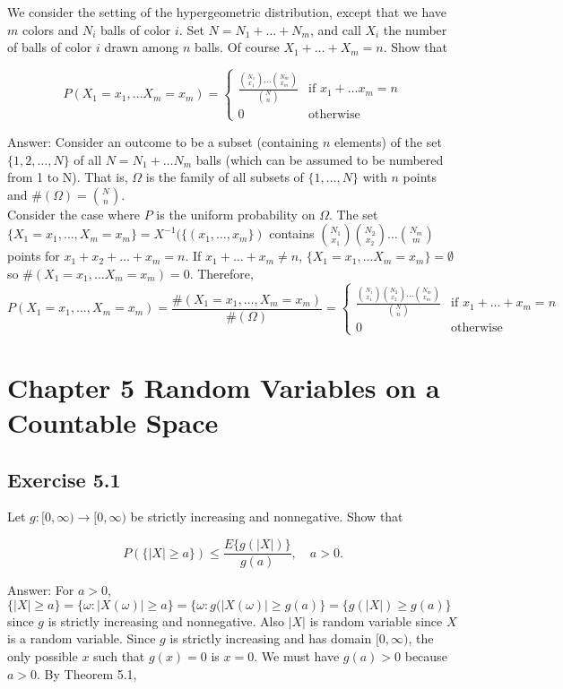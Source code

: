 \documentclass{article}
\begin{document}
We consider the setting of the hypergeometric distribution, except that we have $m$ colors and $N_i$ balls of color $i$. Set $N = N_1+\dots +N_m$, and call $X_i$ the
number of balls of color $i$ drawn among $n$ balls. Of course $X_1 + \dots +X_m = n$.
Show that

$$
P(X_1 = x_1, \dots X_m = x_m) = 
\begin{cases}
\frac{\binom{N_1}{x_1} \dots \binom{N_m}{x_m}}{\binom{N}{n}} & \text{if } x_1 + \dots x_m = n \\
0 & \text{otherwise}
\end{cases}
$$

Answer: Consider an outcome to be a subset (containing $n$ elements) of the set $\{1,2, \dots, N\}$ of all $N = N_1+\dots N_m$ balls (which can be assumed to be numbered from 1 to N). That is, $\Omega$ is the family of all subsets of $\{1,\dots, N\}$ with $n$ points and $\#(\Omega) = \binom{N}{n}$. \\

Consider the case where $P$ is the uniform probability on $\Omega$. The set $\{X_1 = x_1, \dots , X_m = x_m\} = X^{-1}(\{(x_1, \dots , x_m\})$ contains $\binom{N_1}{x_1}\binom{N_2}{x_2} \dots \binom{N_m}{m}$ points for $x_1 + x_2 + \dots + x_m = n$. If $x_1 + \dots + x_m \neq n$, $ \{X_1 = x_1, \dots X_m = x_m\} = \emptyset$ so $\#(X_1 = x_1, \dots X_m = x_m) = 0$. Therefore,
$$
P(X_1 = x_1, \dots , X_m = x_m) = \frac{\#(X_1 = x_1, \dots , X_m = x_m)}{\#(\Omega)} 
=
\begin{cases}
\frac{\binom{N_1}{x_1} \binom{N_2}{x_2}\dots \binom{N_m}{x_m}}{\binom{N}{n}} & \text{if } x_1 + \dots + x_m = n \\
0 & \text{otherwise}
\end{cases}
$$


\section*{Chapter 5 Random Variables on a Countable Space}

\subsection*{Exercise 5.1}

Let $g : [0, \infty) \rightarrow [0,\infty)$ be strictly increasing and nonnegative. Show that

$$
P(\{|X| \geq a\}) \leq
\frac{E\{g(|X|)\}}
{g(a)}, \quad a > 0.
$$

Answer: For $a > 0$, $\{|X| \geq a \} = \{\omega : |X(\omega)| \geq a\} = \{\omega : g(|X(\omega)| \geq g(a)\} = \{g(|X|) \geq g(a)\}$ since $g$ is strictly increasing and nonnegative. Also $|X|$ is random variable since $X$ is a random variable. Since $g$ is strictly increasing and has domain $[0,\infty)$, the only possible $x$ such that $g(x) = 0$ is $x = 0$. We must have $g(a) > 0$ because $a > 0$. By Theorem 5.1,
\end{document}
